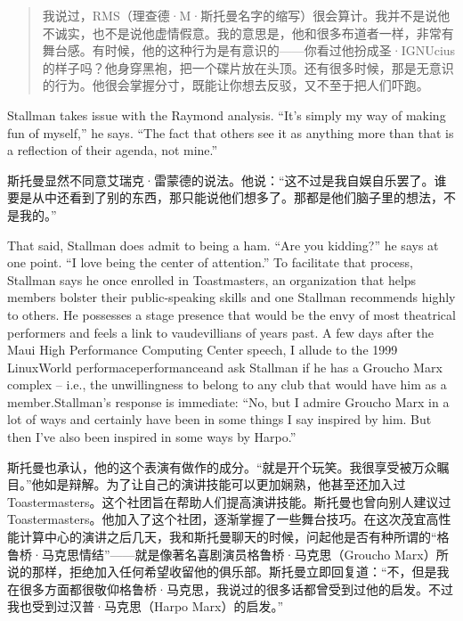 \ifdefined\chs
\begin{quote}
我说过，RMS（理查德·M·斯托曼名字的缩写）很会算计。我并不是说他不诚实，也不是说他虚情假意。我的意思是，他和很多布道者一样，非常有舞台感。有时候，他的这种行为是有意识的——你看过他扮成圣·IGNUcius的样子吗？他身穿黑袍，把一个碟片放在头顶。还有很多时候，那是无意识的行为。他很会掌握分寸，既能让你想去反驳，又不至于把人们吓跑。
\end{quote}
\fi

\ifdefined\eng
Stallman takes issue with the Raymond analysis. ``It's simply my way of making fun of myself,'' he says. ``The fact that others see it as anything more than that is a reflection of their agenda, not mine.''
\fi

\ifdefined\chs
斯托曼显然不同意艾瑞克·雷蒙德的说法。他说：``这不过是我自娱自乐罢了。谁要是从中还看到了别的东西，那只能说他们想多了。那都是他们脑子里的想法，不是我的。''
\fi

\ifdefined\eng
That said, Stallman does admit to being a ham. ``Are you kidding?'' he says at one point. ``I love being the center of attention.'' To facilitate that process, Stallman says he once enrolled in Toastmasters, an organization that helps members bolster their public-speaking skills and one Stallman recommends highly to others. He possesses a stage presence that would be the envy of most theatrical performers and feels a link to vaudevillians of years past. A few days after the Maui High Performance Computing Center speech, I allude to the 1999 LinuxWorld \ifdefined\vone performace\fi\ifdefined\vtwo performance\fi and ask Stallman if he has a Groucho Marx complex -- i.e., the unwillingness to belong to any club that would have him as a member.\ifdefined\vtwo{}\fi Stallman's response is immediate: ``No, but I admire Groucho Marx in a lot of ways and certainly have been in some things I say inspired by him. But then I've also been inspired in some ways by Harpo.''
\fi

\ifdefined\chs
斯托曼也承认，他的这个表演有做作的成分。``就是开个玩笑。我很享受被万众瞩目。''他如是辩解。为了让自己的演讲技能可以更加娴熟，他甚至还加入过Toastermasters。这个社团旨在帮助人们提高演讲技能。斯托曼也曾向别人建议过Toastermasters。他加入了这个社团，逐渐掌握了一些舞台技巧。在这次茂宜高性能计算中心的演讲之后几天，我和斯托曼聊天的时候，问起他是否有种所谓的``格鲁桥·马克思情结''——就是像著名喜剧演员格鲁桥·马克思（Groucho Marx）所说的那样，拒绝加入任何希望收留他的俱乐部\ifdefined\vtwo{}\fi。斯托曼立即回复道：``不，但是我在很多方面都很敬仰格鲁桥·马克思，我说过的很多话都曾受到过他的启发。不过我也受到过汉普·马克思（Harpo Marx）的启发。''
\fi

